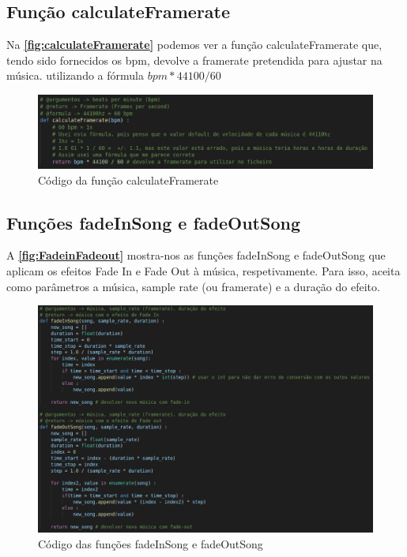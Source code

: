 \documentclass{report}
\begin{document}
\subsection{Função calculateFramerate}
\label{ssec:calculateFramerate}
Na \textbf{\autoref{fig:calculateFramerate}} podemos ver a função calculateFramerate que, tendo sido fornecidos os \ac{bpm},
devolve a framerate pretendida para ajustar na música. utilizando a fórmula \(bpm * 44100 / 60\)

\begin{figure}[!h]
\center 
\includegraphics[width=330pt]{img/calculateFramerate.png}
\caption{Código da função calculateFramerate}
\label{fig:calculateFramerate}
\end{figure}

\subsection{Funções fadeInSong e fadeOutSong}
\label{ssec:FadeinFadeout}
A \textbf{\autoref{fig:FadeinFadeout}} mostra-nos as funções fadeInSong e fadeOutSong que aplicam os efeitos Fade In e Fade Out 
à música, respetivamente. Para isso, aceita como parâmetros a música, sample rate (ou framerate) e a duração do efeito.

\begin{figure}[!h]
\center 
\includegraphics[width=330pt]{img/fadeInFadeOut.png}
\caption{Código das funções fadeInSong e fadeOutSong}
\label{fig:FadeinFadeout}
\end{figure}
\end{document}
